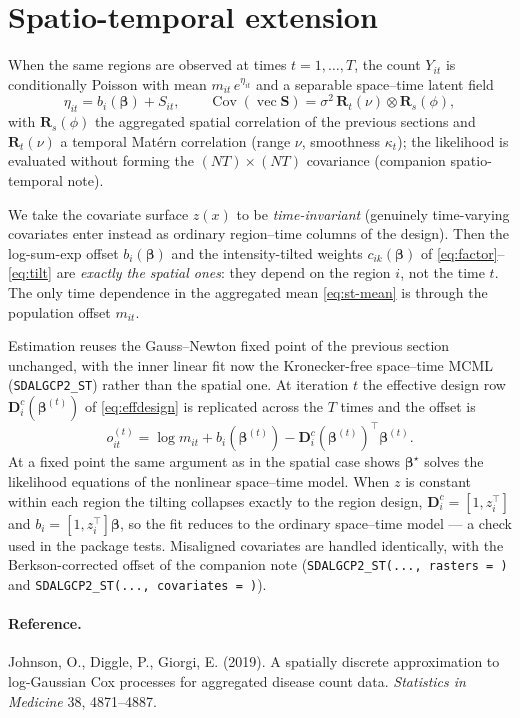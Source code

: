 \documentclass[11pt]{article}
\newcommand{\R}{\mathbf{R}}
\newcommand{\D}{\mathbf{D}}
\newcommand{\bet}{\bm{\beta}}
\newcommand{\Cov}{\operatorname{Cov}}
\begin{document}
\section{Spatio-temporal extension}

When the same regions are observed at times $t=1,\dots,T$, the count $Y_{it}$ is
conditionally Poisson with mean $m_{it}\,e^{\eta_{it}}$ and a separable space--time
latent field
\begin{equation}
\eta_{it}=b_i(\bet)+S_{it},
\qquad
\Cov(\operatorname{vec}\mathbf S)=\sigma^2\,\R_t(\nu)\otimes\R_s(\phi),
\label{eq:st-mean}
\end{equation}
with $\R_s(\phi)$ the aggregated spatial correlation of the previous sections and
$\R_t(\nu)$ a temporal Mat\'ern correlation (range $\nu$, smoothness $\kappa_t$);
the likelihood is evaluated without forming the $(NT)\times(NT)$ covariance
(companion spatio-temporal note).

We take the covariate surface $z(x)$ to be \emph{time-invariant} (genuinely
time-varying covariates enter instead as ordinary region--time columns of the
design). Then the log-sum-exp offset $b_i(\bet)$ and the intensity-tilted weights
$c_{ik}(\bet)$ of \eqref{eq:factor}--\eqref{eq:tilt} are \emph{exactly the spatial
ones}: they depend on the region $i$, not the time $t$. The only time dependence in
the aggregated mean \eqref{eq:st-mean} is through the population offset $m_{it}$.

Estimation reuses the Gauss--Newton fixed point of the previous section unchanged,
with the inner linear fit now the Kronecker-free space--time MCML
(\texttt{SDALGCP2\_ST}) rather than the spatial one. At iteration $t$ the effective
design row $\D^c_i(\bet^{(t)})$ of \eqref{eq:effdesign} is replicated across the
$T$ times and the offset is
\begin{equation}
o_{it}^{(t)}=\log m_{it}+b_i(\bet^{(t)})-\D^c_i(\bet^{(t)})^\top\bet^{(t)} .
\end{equation}
At a fixed point the same argument as in the spatial case shows $\bet^\star$ solves
the likelihood equations of the nonlinear space--time model. When $z$ is constant
within each region the tilting collapses exactly to the region design,
$\D^c_i=[1,z_i^\top]$ and $b_i=[1,z_i^\top]\bet$, so the fit reduces to the ordinary
space--time model --- a check used in the package tests. Misaligned covariates are
handled identically, with the Berkson-corrected offset of the companion note
(\texttt{SDALGCP2\_ST(..., rasters = )} and \texttt{SDALGCP2\_ST(..., covariates =
)}).

\paragraph{Reference.}
Johnson, O., Diggle, P., Giorgi, E. (2019). A spatially discrete approximation to
log-Gaussian Cox processes for aggregated disease count data. \emph{Statistics in
Medicine} 38, 4871--4887.
\end{document}
